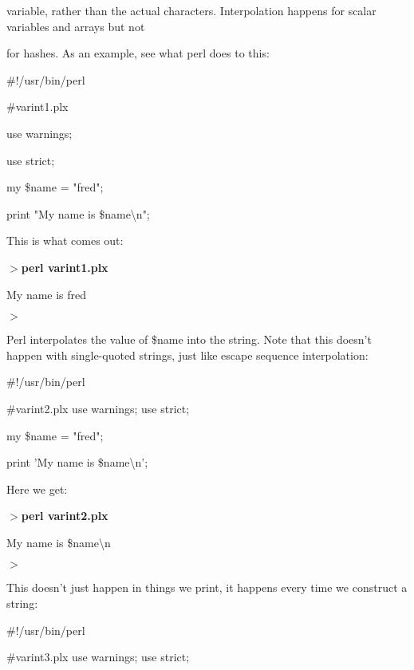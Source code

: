 \documentclass[a4paper,11pt]{book}
\begin{document}
\noindent variable, rather than the actual characters. Interpolation happens for scalar variables and arrays but not

\noindent for hashes. As an example, see what perl does to this:

\noindent 

\noindent 

\noindent \#!/usr/bin/perl

\noindent \#varint1.plx

\noindent use warnings;

\noindent use strict;

\noindent my \$name = "fred";

\noindent print "My name is \$name\textbackslash n";

\noindent 

\noindent This is what comes out:

\noindent 

\noindent $>$\textbf{perl varint1.plx}

\noindent My name is fred

\noindent $>$

\noindent 

\noindent Perl interpolates the value of \$name into the string. Note that this doesn't happen with single-quoted strings, just like escape sequence interpolation:

\noindent 

\noindent \#!/usr/bin/perl

\noindent \#varint2.plx use warnings; use strict;

\noindent my \$name = "fred";

\noindent print 'My name is \$name\textbackslash n';

\noindent 

\noindent Here we get:

\noindent 

\noindent $>$\textbf{perl varint2.plx}

\noindent My name is \$name\textbackslash n

\noindent $>$

\noindent 

\noindent This doesn't just happen in things we print, it happens every time we construct a string:

\noindent 

\noindent \#!/usr/bin/perl

\noindent \#varint3.plx use warnings; use strict;
\end{document}
